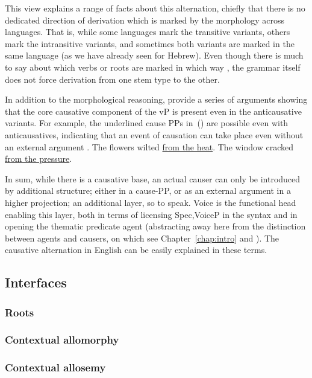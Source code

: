 This view explains a range of facts about this alternation, chiefly that there is no dedicated direction of derivation which is marked by the morphology across languages. That is, while some languages mark the transitive variants, others mark the intransitive variants, and sometimes both variants are marked in the same language (as we have already seen for Hebrew). Even though there is much to say about which verbs or roots are marked in which way \citep{haspelmath93,unaccusativity95,arad05}, the grammar itself does not force derivation from one stem type to the other.

In addition to the morphological reasoning, \cite{layering15} provide a series of arguments showing that the core causative component of the vP is present even in the anticausative variants. For example, the underlined cause PPs in~(\nextx) are possible even with anticausatives, indicating that an event of causation can take place even without an external argument \citep{alexiadouetal06,alexiadouetal06nels}.
\pex
	\a The flowers wilted \underline{from the heat}.
	\a The window cracked \underline{from the pressure}.
\xe

In sum, while there is a causative base, an actual causer can only be introduced by additional structure; either in a cause-PP, or as an external argument in a higher projection; an additional layer, so to speak. Voice is the functional head enabling this layer, both in terms of licensing Spec,VoiceP in the syntax and in opening the thematic predicate agent (abstracting away here from the distinction between agents and causers, on which see Chapter~\ref{chap:intro} and \citealt[7]{layering15}). The causative alternation in English can be easily explained in these terms.


	\subsection{Interfaces}
		\subsubsection{Roots}		
		
		\subsubsection{Contextual allomorphy}

		\subsubsection{Contextual allosemy}


